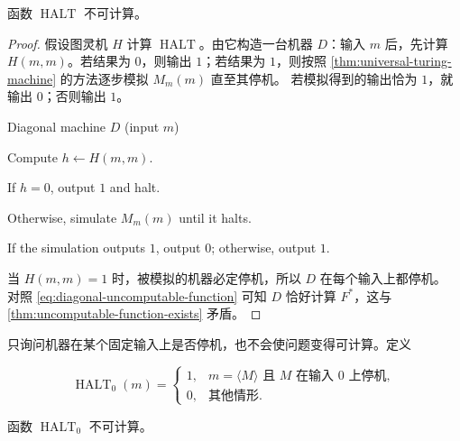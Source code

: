 \begin{theorem}[停机问题不可计算]
  \label{thm:halting-problem-uncomputable}
  函数 $\operatorname{HALT}$ 不可计算。
\end{theorem}

\begin{proof}
  假设图灵机 $H$ 计算 $\operatorname{HALT}$。由它构造一台机器 $D$：输入
  $m$ 后，先计算 $H(m,m)$。若结果为 $0$，则输出 $1$；若结果为 $1$，则按照
  \cref{thm:universal-turing-machine} 的方法逐步模拟 $M_m(m)$ 直至其停机。
  若模拟得到的输出恰为 $1$，就输出 $0$；否则输出 $1$。

  \begin{pseudocode}{Diagonal machine $D$ (input $m$)}
    \item Compute $h\gets H(m,m)$.
    \item If $h=0$, output $1$ and halt.
    \item Otherwise, simulate $M_m(m)$ until it halts.
    \item If the simulation outputs $1$, output $0$; otherwise, output $1$.
  \end{pseudocode}

  当 $H(m,m)=1$ 时，被模拟的机器必定停机，所以 $D$ 在每个输入上都停机。
  对照 \cref{eq:diagonal-uncomputable-function} 可知 $D$ 恰好计算 $F^*$，这与
  \cref{thm:uncomputable-function-exists} 矛盾。
\end{proof}

只询问机器在某个固定输入上是否停机，也不会使问题变得可计算。定义

\[
  \operatorname{HALT}_0(m)=
  \begin{cases}
    1,&m=\langle M\rangle\text{ 且 }M\text{ 在输入 }0\text{ 上停机},\\
    0,&\text{其他情形}.
  \end{cases}
\]

\begin{theorem}[固定输入上的停机问题]
  \label{thm:halt-on-zero-uncomputable}
  函数 $\operatorname{HALT}_0$ 不可计算。
\end{theorem}


